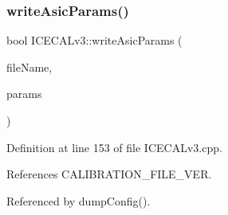 \subsubsection{\texorpdfstring{write\+Asic\+Params()}{writeAsicParams()}}
{\footnotesize\ttfamily bool I\+C\+E\+C\+A\+Lv3\+::write\+Asic\+Params (\begin{DoxyParamCaption}\item[{string}]{file\+Name,  }\item[{Py\+Object $\ast$}]{params }\end{DoxyParamCaption})\hspace{0.3cm}{\ttfamily [private]}}



Definition at line 153 of file I\+C\+E\+C\+A\+Lv3.\+cpp.



References C\+A\+L\+I\+B\+R\+A\+T\+I\+O\+N\+\_\+\+F\+I\+L\+E\+\_\+\+V\+ER.



Referenced by dump\+Config().


